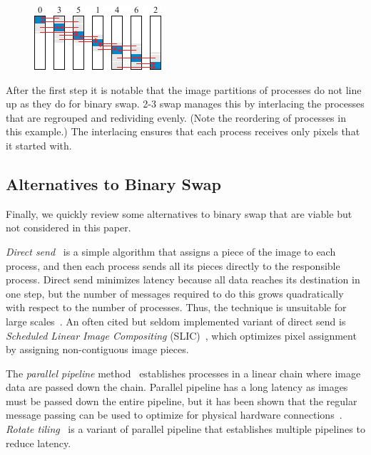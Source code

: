 \documentclass{vgtc}                          %
\newcommand*{\lcite}[1]{~\cite{#1}}
\newcommand*{\keyterm}[1]{\emph{#1}}
\newcommand*{\textalgorithm}[1]{\textsf{#1}\xspace}
\newcommand{\Ttswap}{\textalgorithm{2-3 swap}}
\begin{document}
\begin{figure}
  \includegraphics[scale=.75]{2-3-swap-2}
\end{figure}
After the first step it is notable that the image partitions of processes do not line up as they do for binary swap.
\Ttswap manages this by interlacing the processes that are regrouped and redividing evenly.
(Note the reordering of processes in this example.)
The interlacing ensures that each process receives only pixels that it started with.

\subsection{Alternatives to Binary Swap}
\label{sec:BinarySwapAlternatives}

Finally, we quickly review some alternatives to binary swap that are viable but not considered in this paper.

\keyterm{Direct send}\lcite{DirectSend1} is a simple algorithm that assigns a piece of the image to each process, and then each process sends all its pieces directly to the responsible process.
Direct send minimizes latency because all data reaches its destination in one step, but the number of messages required to do this grows quadratically with respect to the number of processes.
Thus, the technique is unsuitable for large scales\lcite{Moreland2011:SC}.
An often cited but seldom implemented variant of direct send is \keyterm{Scheduled Linear Image Compositing} (SLIC)\lcite{SLIC}, which optimizes pixel assignment by assigning non-contiguous image pieces.

The \keyterm{parallel pipeline} method\lcite{Lee1996} establishes processes in a linear chain where image data are passed down the chain.
Parallel pipeline has a long latency as images must be passed down the entire pipeline, but it has been shown that the regular message passing can be used to optimize for physical hardware connections\lcite{Wu2009}.
\keyterm{Rotate tiling}\lcite{Lin2004} is a variant of parallel pipeline that establishes multiple pipelines to reduce latency.
\end{document}
